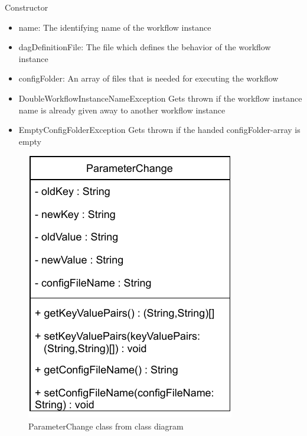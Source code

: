 \begin{methodenv}{Constructor}


\begin{itemize}
	\item{name:}
	The identifying name of the workflow instance
	\item{dagDefinitionFile:}
	The file which defines the behavior of the workflow instance
	\item{configFolder:}
	An array of files that is needed for executing the workflow
\end{itemize}

\begin{itemize}
	\item{DoubleWorkflowInstanceNameException}
	Gets thrown if the workflow instance name is already given away to another workflow instance
	\item{EmptyConfigFolderException}
	Gets thrown if the handed configFolder-array is empty
\end{itemize}

\end{methodenv}



\begin{figure}[h]
\centerline{\includegraphics[scale=1]{res/Klassen/ParameterChange.pdf}}
\caption{ParameterChange class from class diagram}
\end{figure}

